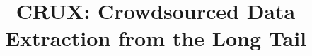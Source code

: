 \documentclass{sig-alternate}
\begin{document}

\title{CRUX: Crowdsourced Data Extraction from the Long Tail}


\maketitle
\end{document}
